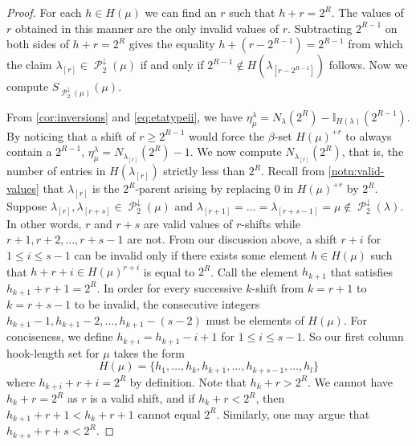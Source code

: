 \documentclass[12pt]{amsart}
\theoremstyle{definition}
\numberwithin{equation}{section}
\newcommand{\la}{\lambda}
\DeclareMathOperator{\p}{\mathcal{P}}
\begin{document}
\begin{proof}

For each $h\in H(\mu)$ we can find an $r$ such that $h + r = 2^R$. The values of $r$ obtained in this manner are the only invalid values of $r$. Subtracting $2^{R-1}$ on both sides of $h + r = 2^R$ gives the equality $h+ (r - 2^{R-1}) = 2^{R-1}$ from which the claim $\lambda_{[r]} \in \p_2^\downarrow(\mu)$ if and only if $2^{R-1}\not\in H(\lambda_{[r-2^{R-1}]})$ follows. Now we compute $S_{\p_2^\downarrow(\mu)}(\mu)$.

From \cref{cor:inversions} and \cref{eq:etatypeii}, we have $\eta^\lambda_\mu = N_{\lambda}(2^R) - \mathbb{I}_{H(\lambda)}(2^{R-1})$. By noticing that a shift of $r\geq 2^{R-1}$ would force the $\beta$-set $H(\mu)^{+r}$ to always contain a $2^{R-1}$, $\eta^\la_\mu= N_{\lambda_{[r]}}(2^R) - 1$. We now compute $N_{\lambda_{[r]}}(2^R)$, that is, the number of entries in $H(\la_{[r]})$ strictly less than $2^R$. Recall from \cref{notn:valid-values} that $\la_{[r]}$ is the $2^R$-parent arising by replacing $0$ in $H(\mu)^{+r}$ by $2^R$.
Suppose $\lambda_{[r]}, \lambda_{[r+s]}\in \p_2^\downarrow(\mu)$ and $\lambda_{[r+1]} = \ldots = \lambda_{[r+s-1]} = \mu\not\in \p_2^\downarrow(\lambda)$. In other words, $r$ and $r+s$ are valid values of $r$-shifts while $r+1, r+2, \ldots, r+s-1$ are not. From our discussion above, a shift $r+i$ for $1\leq i \leq s-1$ can be invalid only if there exists some element $h\in H(\mu)$ such that $h + r+i \in H(\mu)^{r+i}$ is equal to $2^R$. Call the element $h_{k+1}$ that satisfies $h_{k+1} + r+1 = 2^R$. In order for every successive $k$-shift from $k = r+1$ to $k = r+s-1$ to be invalid, the consecutive integers $h_{k+1} -1, h_{k+1} - 2,\ldots, h_{k+1} - (s-2)$ must be elements of $H(\mu)$. For conciseness, we define $h_{k+i} = h_{k+1} - i + 1$ for $1\leq i\leq s-1$. So our first column hook-length set for $\mu$ takes the form \[H(\mu) = \{h_1, \ldots, h_k, h_{k+1}, \ldots, h_{k+s-1},\ldots, h_{l}\}\] where $h_{k+i} + r + i = 2^R$ by definition. 
Note that $h_k + r >2^R$. We cannot have $h_k + r = 2^R$ as $r$ is a valid shift, and if $h_k + r < 2^R$, then $h_{k+1} + r + 1 < h_k + r + 1$ cannot equal $2^R$. Similarly, one may argue that $h_{k+s} + r + s < 2^R$.


\end{proof}
\end{document}
